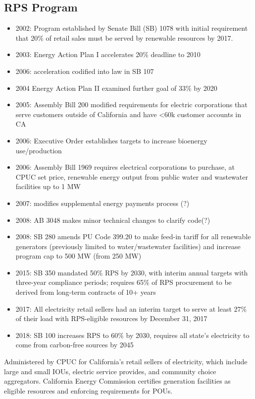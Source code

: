 \documentclass[11pt, oneside]{article}   	%
\begin{document}
\subsection{RPS Program}
\begin{itemize}
\item 2002:  Program established by Senate Bill (SB) 1078 with initial requirement that 20\% of retail sales must be served by renewable resources by 2017.  
\item 2003: Energy Action Plan I accelerates 20\% deadline to 2010
\item 2006: acceleration codified into law in SB 107
\item 2004 Energy Action Plan II examined further goal of 33\% by 2020
\item 2005: Assembly Bill 200 modified requirements for electric corporations that serve customers outside of California and have <60k customer accounts in CA 
\item 2006: Executive Order establishes targets to increase bioenergy use/production
\item 2006: Assembly Bill 1969 requires electrical corporations to purchase, at CPUC set price, renewable energy output from public water and wastewater facilities up to 1 MW
\item 2007: modifies supplemental energy payments process (?)
\item 2008: AB 3048 makes minor technical changes to clarify code(?)
\item 2008: SB 280 amends PU Code 399.20 to make feed-in tariff for all renewable generators (previously limited to water/wastewater facilities) and increase program cap to 500 MW (from 250 MW) 
\item 2015: SB 350 mandated 50\% RPS by 2030, with interim annual targets with three-year compliance periods; requires 65\% of RPS procurement to be derived from long-term contracts of 10+ years
\item 2017: All electricity retail sellers had an interim target to serve at least 27\% of their load with RPS-eligible resources by December 31, 2017
\item 2018: SB 100 increases RPS to 60\% by 2030, requires all state's electricity to come from carbon-free sources by 2045
\end{itemize}

Administered by CPUC for California's retail sellers of electricity, which include large and small IOUs, electric service provides, and community choice aggregators.  California Energy Commission certifies generation facilities as eligible resources and enforcing requirements for POUs.  
\end{document}
